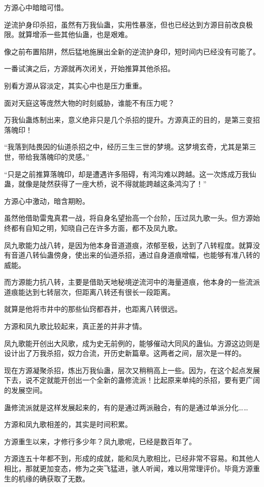 \begin{this_body}
方源心中暗暗可惜。

逆流护身印杀招，虽然有万我仙蛊，实用性暴涨，但也已经达到方源目前改良极限。就算增添一些其他仙蛊，也是艰难。

像之前布置陷阱，然后猛地施展出全新的逆流护身印，短时间内已经没有可能了。

一番试演之后，方源就再次闭关，开始推算其他杀招。

别看方源从容淡定，其实心中也是压力重重。

面对天庭这等庞然大物的时刻威胁，谁能不有压力呢？

万我仙蛊炼制出来，意义绝非只是几个杀招的提升。方源真正的目的，是第三变招落魄印！

“我落到陆畏因的仙道杀招之中，经历三生三世的梦境。这梦境玄奇，尤其是第三世，带给我落魄印的灵感。”

“只是之前推算落魄印，却是遭遇许多阻碍，有鸿沟难以跨越。这一次炼成万我仙蛊，就像是陡然获得了一座大桥，说不得就能跨越这条鸿沟了！”

方源心中激动，暗含期盼。

虽然他借助雷鬼真君一战，将自身名望抬高一个台阶，压过凤九歌一头。但方源始终都有自知之明，知晓自己在许多方面，都不及凤九歌。

凤九歌能力战八转，是因为他本身音道道痕，浓郁至极，达到了八转程度。就算没有音道八转仙蛊傍身，使出来的仙道杀招，通过自身道痕增幅，也能够有准八转的威能。

而方源能力抗八转，主要是借助天地秘境逆流河中的海量道痕，他本身的一些流派道痕能达到七转层次，但距离八转还有很长一段距离。

就算是他将市井中的那些仙窍都吞并，也距离八转很远。

方源和凤九歌比较起来，真正差的并非才情。

凤九歌能开创出大风歌，成为史无前例的，能够催动大同风的蛊仙。方源这边则是设计出了万我杀招，奴力合流，开历史新篇章。这两者之间，层次是一样的。

现在方源凝聚杀招，炼出万我仙蛊，层次又稍稍高上一些。因为，在这个起点发展下去，说不定就能开创出一个全新的蛊修流派！比起原来单纯的杀招，要有更广阔的发展空间。

蛊修流派就是这样发展起来的，有的是通过两派融合，有的是通过单派分化……

方源和凤九歌相差的，其实是时间积累。

方源重生以来，才修行多少年？凤九歌呢，已经是数百年了。

方源连五十年都不到，形成的成就，能和凤九歌相比，已经非常不容易。和其他人相比，那就更加变态，修为之突飞猛进，骇人听闻，难以用常理评价。毕竟方源重生的机缘的确获取了无数。


\end{this_body}
